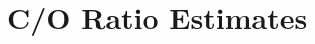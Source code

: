 \documentclass[apj]{emulateapj}
\newcommand{\emgr}[1]{\emph{ \color{gray} #1}}
\begin{document}



\section{C/O Ratio Estimates}
\label{sec:COratio}
\end{document}
